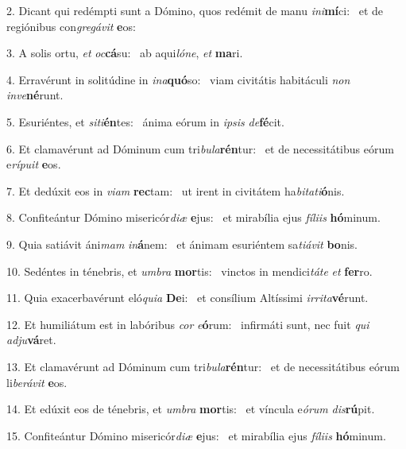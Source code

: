 2. Dicant qui redémpti sunt a Dómino, quos redémit de manu \textit{in}\textit{i}\textbf{mí}ci: \ast\  et de regiónibus con\textit{gre}\textit{gá}\textit{vit} \textbf{e}os:\

3. A solis ortu, \textit{et} \textit{oc}\textbf{cá}su: \ast\  ab aqui\textit{ló}\textit{ne}, \textit{et} \textbf{ma}ri.\

4. Erravérunt in solitúdine in \textit{in}\textit{a}\textbf{quó}so: \ast\  viam civitátis habitáculi \textit{non} \textit{in}\textit{ve}\textbf{né}runt.\

5. Esuriéntes, et \textit{si}\textit{ti}\textbf{én}tes: \ast\  ánima eórum in \textit{ip}\textit{sis} \textit{de}\textbf{fé}cit.\

6. Et clamavérunt ad Dóminum cum tri\textit{bu}\textit{la}\textbf{rén}tur: \ast\  et de necessitátibus eórum e\textit{rí}\textit{pu}\textit{it} \textbf{e}os.\

7. Et dedúxit eos in \textit{vi}\textit{am} \textbf{rec}tam: \ast\  ut irent in civitátem ha\textit{bi}\textit{ta}\textit{ti}\textbf{ó}nis.\

8. Confiteántur Dómino misericór\textit{di}\textit{æ} \textbf{e}jus: \ast\  et mirabília ejus \textit{fí}\textit{li}\textit{is} \textbf{hó}minum.\

9. Quia satiávit áni\textit{mam} \textit{in}\textbf{á}nem: \ast\  et ánimam esuriéntem sa\textit{ti}\textit{á}\textit{vit} \textbf{bo}nis.\

10. Sedéntes in ténebris, et \textit{um}\textit{bra} \textbf{mor}tis: \ast\  vinctos in mendici\textit{tá}\textit{te} \textit{et} \textbf{fer}ro.\

11. Quia exacerbavérunt eló\textit{qui}\textit{a} \textbf{De}i: \ast\  et consílium Altíssimi \textit{ir}\textit{ri}\textit{ta}\textbf{vé}runt.\

12. Et humiliátum est in labóribus \textit{cor} \textit{e}\textbf{ó}rum: \ast\  infirmáti sunt, nec fuit \textit{qui} \textit{ad}\textit{ju}\textbf{vá}ret.\

13. Et clamavérunt ad Dóminum cum tri\textit{bu}\textit{la}\textbf{rén}tur: \ast\  et de necessitátibus eórum li\textit{be}\textit{rá}\textit{vit} \textbf{e}os.\

14. Et edúxit eos de ténebris, et \textit{um}\textit{bra} \textbf{mor}tis: \ast\  et víncula e\textit{ó}\textit{rum} \textit{dis}\textbf{rú}pit.\

15. Confiteántur Dómino misericór\textit{di}\textit{æ} \textbf{e}jus: \ast\  et mirabília ejus \textit{fí}\textit{li}\textit{is} \textbf{hó}minum.\

